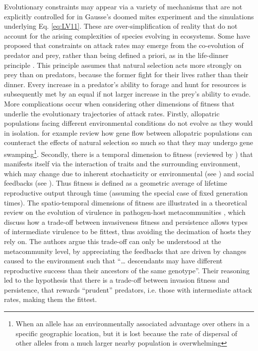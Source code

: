\documentclass[a4paper]{report}
\begin{document}
Evolutionary constraints may appear via a variety of mechanisms that are not explicitly controlled for in Gausse's doomed mites experiment and the simulations underlying Eq. \eqref{eq:LV11}. These are over-simplification of reality that do not account for the arising complexities of species evolving in ecosystems. Some have proposed that constraints on attack rates may emerge from the co-evolution of predator and prey, rather than being defined a priori, as in the life-dinner principle \citep{arms_race}. This principle assumes that natural selection acts more strongly on prey than on predators, because the former fight for their lives rather than their dinner. Every increase in a predator’s ability to forage and hunt for resources is subsequently met by an equal if not larger increase in the prey’s ability to evade. More complications occur when considering other dimensions of fitness that underlie the evolutionary trajectories of attack rates. Firstly, allopatric populations facing different environmental conditions do not evolve as they would in isolation. \citep{Thomas2002} for example review how gene flow between allopatric populations can counteract the effects of natural selection so much so that they may undergo gene swamping\footnote{When an allele has an environmentally associated advantage over others in a specific geographic location, but it is lost because the rate of dispersal of other alleles from a much larger nearby population is overwhelming}. Secondly, there is a temporal dimension to fitness (reviewed by \citep{Hendry2018}) that manifests itself via the interaction of traits and the surrounding environment, which may change due to inherent stochasticity or environmental (see \citep{Brisson2018}) and social feedbacks (see \citep{Nowak2012}). Thus fitness is defined as a geometric average of lifetime reproductive output through time (assuming the special case of fixed generation times). The spatio-temporal dimensions of fitness are illustrated in a theoretical review on the evolution of virulence in pathogen-host metacommunities \citep{Goodnight2008}, which discuss how a trade-off between invasiveness fitness and persistence allows types of intermediate virulence to be fittest, thus avoiding the decimation of hosts they rely on. The authors argue this trade-off can only be understood at the metacommunity level, by appreciating the feedbacks that are driven by changes caused to the environment such that “… descendants may have different reproductive success than their ancestors of the same genotype”. Their reasoning led to the hypothesis that there is a trade-off between invasion fitness and persistence, that rewards “prudent” predators, i.e. those with intermediate attack rates, making them the fittest. \\
\end{document}
